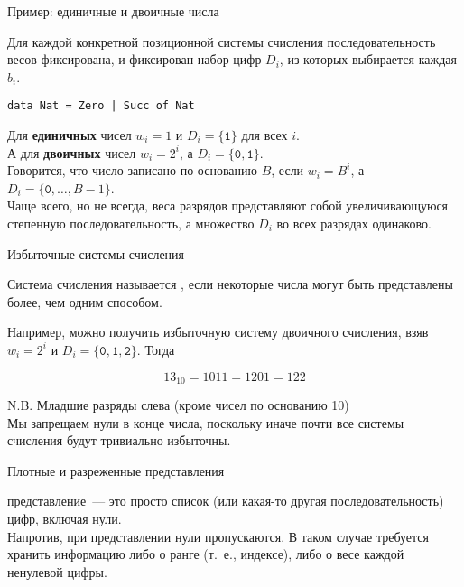 \begin{frame}[fragile]{Пример: единичные и двоичные числа}

 Для каждой конкретной позиционной системы счисления
последовательность весов фиксирована, и фиксирован набор цифр $D_i$,
из которых выбирается каждая $b_i$. 

\begin{verbatim}
data Nat = Zero | Succ of Nat
\end{verbatim}
Для \textbf{единичных} чисел $w_i = 1$ и $D_i = \{\mathtt{1}\}$ для всех $i$.\\

А для \textbf{двоичных} чисел $w_i = 2^i$,
а $D_i = \{\mathtt{0}, \mathtt{1}\}$. \\

Говорится, что число записано по основанию $B$, если $w_i =
B^i$, а $D_i = \{\mathtt{0}, \ldots, B-1\}$. \\

Чаще всего, но не всегда,
веса разрядов представляют собой увеличивающуюся степенную
последовательность, а множество $D_i$ во всех разрядах одинаково.
\end{frame}

\begin{frame}[fragile]{Избыточные системы счисления}

Система счисления называется , если
некоторые числа могут быть представлены более, чем одним способом.


Например, можно получить избыточную систему двоичного счисления, взяв
$w_i = 2^i$ и $D_i = \{\mathtt{0}, \mathtt{1}, \mathtt{2}\}$. Тогда

$$
13_{10} = 1011 = 1201 = 122
$$

N.B. Младшие разряды слева (кроме чисел по основанию 10)\\

 Мы запрещаем нули в конце числа,
поскольку иначе почти все системы счисления будут тривиально
избыточны.
\end{frame}

\begin{frame}[fragile]{Плотные и разреженные представления}


 представление~--- это просто список (или какая-то другая
последовательность) цифр, включая нули. \\

Напротив, при 
представлении нули пропускаются. В таком случае требуется хранить
информацию либо о ранге (т.~е., индексе), либо о весе каждой ненулевой
цифры.   \\


\end{frame}

